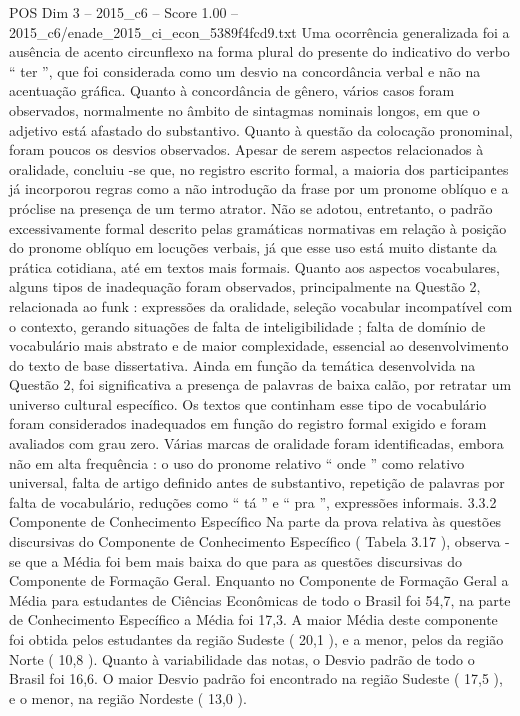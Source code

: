 \begin{textsample}{POS Dim 3 – 2015\_c6 – Score 1.00 – 2015\_c6/enade\_2015\_ci\_econ\_5389f4fcd9.txt}
Uma ocorrência generalizada foi a ausência de acento circunflexo na forma plural do presente do indicativo do verbo “ ter ”, que foi considerada como um desvio na concordância verbal e não na acentuação gráfica.
Quanto à concordância de gênero, vários casos foram observados, normalmente no âmbito de sintagmas nominais longos, em que o adjetivo está afastado do substantivo.
Quanto à questão da colocação pronominal, foram poucos os desvios observados.
Apesar de serem aspectos relacionados à oralidade, concluiu -se que, no registro escrito formal, a maioria dos participantes já incorporou regras como a não introdução da frase por um pronome oblíquo e a próclise na presença de um termo atrator.
Não se adotou, entretanto, o padrão excessivamente formal descrito pelas gramáticas normativas em relação à posição do pronome oblíquo em locuções verbais, já que esse uso está muito distante da prática cotidiana, até em textos mais formais.
Quanto aos aspectos vocabulares, alguns tipos de inadequação foram observados, principalmente na Questão 2, relacionada ao funk : expressões da oralidade, seleção vocabular incompatível com o contexto, gerando situações de falta de inteligibilidade ; falta de domínio de vocabulário mais abstrato e de maior complexidade, essencial ao desenvolvimento do texto de base dissertativa.
Ainda em função da temática desenvolvida na Questão 2, foi significativa a presença de palavras de baixa calão, por retratar um universo cultural específico.
Os textos que continham esse tipo de vocabulário foram considerados inadequados em função do registro formal exigido e foram avaliados com grau zero.
Várias marcas de oralidade foram identificadas, embora não em alta frequência : o uso do pronome relativo “ onde ” como relativo universal, falta de artigo definido antes de substantivo, repetição de palavras por falta de vocabulário, reduções como “ tá ” e “ pra ”, expressões informais. 3.3.2 Componente de Conhecimento Específico Na parte da prova relativa às questões discursivas do Componente de Conhecimento Específico ( Tabela 3.17 ), observa -se que a Média foi bem mais baixa do que para as questões discursivas do Componente de Formação Geral.
Enquanto no Componente de Formação Geral a Média para estudantes de Ciências Econômicas de todo o Brasil foi 54,7, na parte de Conhecimento Específico a Média foi 17,3.
A maior Média deste componente foi obtida pelos estudantes da região Sudeste ( 20,1 ), e a menor, pelos da região Norte ( 10,8 ).
Quanto à variabilidade das notas, o Desvio padrão de todo o Brasil foi 16,6.
O maior Desvio padrão foi encontrado na região Sudeste ( 17,5 ), e o menor, na região Nordeste ( 13,0 ).

\end{textsample}

